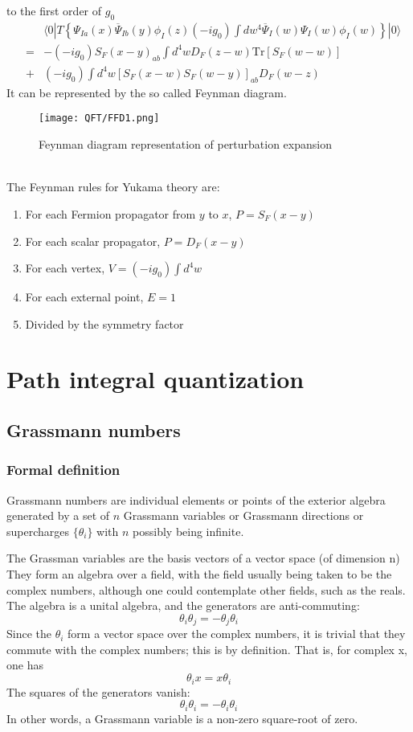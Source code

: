 to the first order of $g_0$
\begin{eqnarray}
& &\langle 0 | T \left\{ \Psi_{Ia}(x) \overline{\Psi}_{Ib}(y) \phi_I(z) (-i g_0) \int dw^4 \overline{\Psi}_I(w) \Psi_I(w) \phi_I(w) \right\} | 0 \rangle \nonumber \\
&=& -(-ig_0) S_F(x-y)_{ab} \int d^4 w D_F(z-w) \mathrm{Tr}[S_F(w-w)] \nonumber \\
&+&  (-ig_0) \int d^4 w  [S_F(x-w) S_F(w-y)]_{ab} D_F(w-z) \nonumber
\end{eqnarray}
It can be represented by the so called Feynman diagram.
\begin{figure}[!h]
\centering
\texttt{[image: QFT/FFD1.png]}
\caption{Feynman diagram representation of perturbation expansion}
\end{figure}\\
The Feynman rules for Yukama theory are:
\begin{enumerate}
\item For each Fermion propagator from $y$ to $x$, $P = S_F(x-y)$
\item For each scalar propagator, $P = D_F(x-y)$
\item For each vertex, $V = (-ig_0)\int d^4w$
\item For each external point, $E=1$
\item Divided by the symmetry factor
\end{enumerate}

\section{Path integral quantization}
\subsection{Grassmann numbers}
\subsubsection{Formal definition}
Grassmann numbers are individual elements or points of the exterior algebra generated by a set of $n$ Grassmann variables or Grassmann directions or supercharges $\{\theta _{i}\}$ with $n$ possibly being infinite.

The Grassman variables are the basis vectors of a vector space (of dimension n) They form an algebra over a field, with the field usually being taken to be the complex numbers, although one could contemplate other fields, such as the reals. The algebra is a unital algebra, and the generators are anti-commuting:
\[\theta _{i}\theta _{j}=-\theta _{j}\theta _{i}\]
Since the $\theta _{i}$ form a vector space over the complex numbers, it is trivial that they commute with the complex numbers; this is by definition. That is, for complex x, one has
\[\theta _{i}x=x\theta _{i}\]
The squares of the generators vanish:
\[\theta_i \theta_i = -\theta_i \theta_i\]
In other words, a Grassmann variable is a non-zero square-root of zero.


